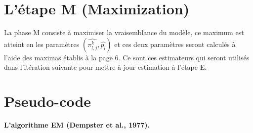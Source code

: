 \documentclass[frenchb]{report}
\newcommand{\1}{\mathbbm{1}}
\theoremstyle{definition}\newtheorem{defn}{Définition}
\theoremstyle{definition}\newtheorem{exm}{Exemple}
\theoremstyle{definition}\newtheorem{nota}{Notation}
\theoremstyle{definition}\newtheorem{rem}{Remarque}
\begin{document}
\section{L'étape M (Maximization)}

La phase M consiste à maximiser la vraisemblance du modèle, ce maximum est atteint en les paramètres $\left(\widehat{\pi^k_{l,j}}, \widehat{p_l} \right)$ et ces deux paramètres seront calculés à l'aide des maximas établis à la page $6$. Ce sont ces estimateurs qui seront utilisés dans l'itération suivante pour mettre à jour estimation à l'étape E.

\section{Pseudo-code}

\begin{algorithm}
	\caption{\textbf{L’algorithme EM (Dempster et al., 1977).}}
	\begin{algorithmic}[1]
		\ENDFOR
	\end{algorithmic}
\end{algorithm}
\end{document}
